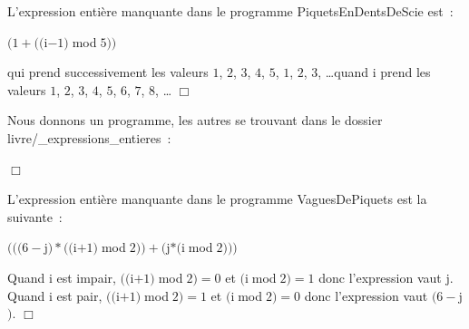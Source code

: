 \begin{corrige} {L'expression entière manquante dans le programme {\idt Piquets\-En\-Dents\-De\-Scie} est~:
\begin{center}
$(1 + ((${\idt i}$ - 1)\;${\mcl mod}$\;5))$
\end{center}
qui prend successivement les valeurs $1$, $2$, $3$, $4$, $5$, $1$, $2$, $3$, \dots quand {\idt i} prend les
valeurs $1$, $2$, $3$, $4$, $5$, $6$, $7$, $8$, \ldots
\noindent $\Box$}\end{corrige}
\begin{corrige} {Nous donnons un programme, les autres se trouvant dans le dossier
{\idt livre/\_expressions\_entieres}~:

\noindent $\Box$}\end{corrige}
\begin{corrige} {L'expression entière manquante dans le programme {\idt VaguesDePiquets} est la suivante~:
\begin{center}
$(((6-${\idt j}$)\ast ((${\idt i}$+1)\;${\mcl mod}$\;2))+(${\idt j}$\ast(${\idt i}$\;${\mcl mod}$\;2)))$
\end{center}
Quand {\idt i} est impair, $((${\idt i}$+1)\;${\mcl mod}$\;2) = 0$ et $(${\idt i}$\;${\mcl mod}$\;2) = 1$
donc l'expression vaut {\idt j}. Quand {\idt i} est pair, $((${\idt i}$+1)\;${\mcl mod}$\;2) = 1$ et 
$(${\idt i}$\;${\mcl mod}$\;2) = 0$ donc l'expression vaut $(6-${\idt j}$)$.
$\Box$}\end{corrige}
